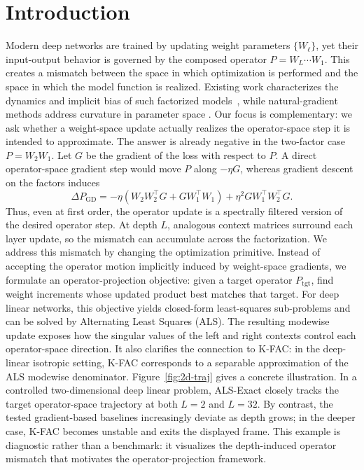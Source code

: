 \documentclass{article}
\begin{document}
\section{Introduction}
\label{sec:intro}
Modern deep networks are trained by updating weight parameters
$\{W_\ell\}$, yet their input-output behavior is governed by the composed
operator $P = W_L \cdots W_1$. This creates a mismatch between the space in
which optimization is performed and the space in which the model function is
realized. Existing work characterizes the dynamics and implicit bias of such
factorized models~\cite{saxe2014exact, gunasekar2017implicit}, while
natural-gradient methods address curvature in parameter space
\cite{martens2020new}. Our focus is complementary: we ask
whether a weight-space update actually realizes the operator-space step it is
intended to approximate.
%
The answer is already negative in the two-factor case $P = W_2 W_1$. Let $G$
be the gradient of the loss with respect to $P$. A direct operator-space
gradient step would move $P$ along $-\eta G$, whereas gradient descent on the
factors induces
\begin{equation*}
  \Delta P_{\mathrm{GD}}
  =
  -\eta(W_2 W_2^\top G + G W_1^\top W_1)
  + \eta^2 G W_1^\top W_2^\top G .
  \label{eq:gd-mismatch-intro}
\end{equation*}
Thus, even at first order, the operator update is a spectrally filtered version
of the desired operator step. At depth $L$, analogous context matrices surround
each layer update, so the mismatch can accumulate across the factorization.
%
We address this mismatch by changing the optimization primitive. Instead of
accepting the operator motion implicitly induced by weight-space gradients, we
formulate an operator-projection objective: given a target operator
$P_{\mathrm{tgt}}$, find weight increments whose updated product best matches
that target. For deep linear networks, this objective yields closed-form
least-squares sub-problems and can be solved by Alternating Least Squares (ALS).
The resulting modewise update exposes how the singular values of the left and
right contexts control each operator-space direction. It also clarifies the
connection to K-FAC: in the deep-linear isotropic setting, K-FAC corresponds to
a separable approximation of the ALS modewise denominator. 
Figure~\ref{fig:2d-traj} gives a concrete illustration. In a controlled
two-dimensional deep linear problem, ALS-Exact closely tracks the target
operator-space trajectory at both $L=2$ and $L=32$. By contrast, the tested
gradient-based baselines increasingly deviate as depth grows; in the deeper
case, K-FAC becomes unstable and exits the displayed frame. This example is
diagnostic rather than a benchmark: it visualizes the depth-induced operator
mismatch that motivates the operator-projection framework.
\end{document}
